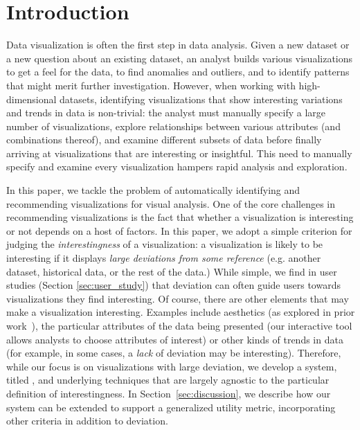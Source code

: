 
\section{Introduction}
\label{sec:introduction}
Data visualization is often the first step in data analysis.
Given a new dataset or a new question about an existing dataset, an analyst builds
various visualizations to get a feel for the data, to find anomalies and outliers, 
and to identify patterns that might merit further investigation.
However, when working with high-dimensional datasets, identifying visualizations that
show interesting variations and trends in data is non-trivial:
the analyst must manually specify a large number of visualizations, explore relationships between various
attributes (and combinations thereof), and examine different subsets of data before finally 
arriving at visualizations that are interesting or insightful.
This need to manually specify and examine every visualization hampers rapid analysis 
and exploration.


In this paper, we tackle the problem of automatically 
identifying and recommending 
visualizations for visual analysis.  
One of the core challenges in recommending visualizations is the fact that 
whether a visualization is interesting or not
depends on a host of factors.
In this paper, we adopt a simple criterion for judging the {\em interestingness} of a visualization: 
a visualization is likely to be interesting if it displays 
{\em large deviations from some
reference} (e.g. another dataset, historical data, or the rest of the data.)
While simple, we find in user studies (Section \ref{sec:user_study}) 
that deviation can often guide users towards visualizations they find interesting.
Of course, there are other elements that may make a visualization interesting.
Examples include aesthetics (as explored in prior work~\cite{polaris,Mackinlay:1986:ADG:22949.22950}), 
the particular attributes of the data being presented 
(our interactive tool allows analysts to choose attributes of interest) 
or other kinds of trends in
data (for example, in some cases, a {\it lack} of deviation may be interesting).  
Therefore, while our focus is on visualizations with large deviation, 
we develop a system, titled \SeeDB, 
and underlying techniques that are largely agnostic to the
particular definition of interestingness.
In Section~\ref{sec:discussion}, we describe how our system can be
extended to support a generalized utility metric, incorporating
other criteria in addition to deviation. 

